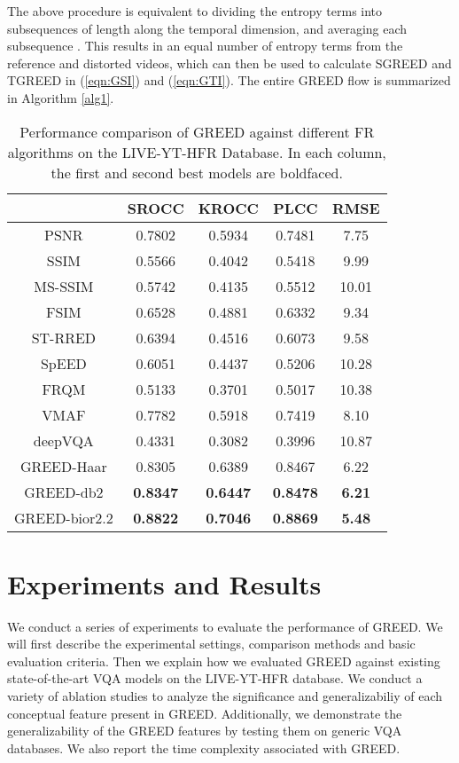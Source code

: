 \documentclass[journal]{IEEEtran}
\begin{document}
The above procedure is equivalent to dividing the entropy terms into subsequences of length  along the temporal dimension, and averaging each subsequence \cite{mackin2018study}. This results in an equal number of entropy terms from the reference and distorted videos, which can then be used to calculate SGREED and TGREED in (\ref{eqn:GSI}) and (\ref{eqn:GTI}). The entire GREED flow is summarized in Algorithm \ref{alg1}.

\begin{table}[t]
\caption{Performance comparison of GREED against different FR algorithms on the LIVE-YT-HFR Database. In each column, the first and second best models are boldfaced.}
    \label{Table:MOS_comparison}
    \centering
    \begin{tabular}{|c||c|c|c|c|}
        \hline
        ~    & SROCC  & KROCC  & PLCC  & RMSE  \\ \hline \hline
        PSNR & 0.7802 & 0.5934 & 0.7481 & 7.75 \\ 
        SSIM \cite{wang2004image} & 0.5566 & 0.4042 & 0.5418 & 9.99 \\ 
        MS-SSIM \cite{wang2003multiscale} & 0.5742 & 0.4135 & 0.5512 & 10.01 \\ 
        FSIM \cite{zhang2011fsim} & 0.6528 & 0.4881 & 0.6332 & 9.34 \\ 
        ST-RRED \cite{soundararajan2012video} & 0.6394 & 0.4516 & 0.6073 & 9.58 \\ 
        SpEED \cite{bampis2017speed} & 0.6051 & 0.4437 & 0.5206 & 10.28 \\ 
        FRQM \cite{zhang2017frame} & 0.5133 & 0.3701 & 0.5017 & 10.38 \\ 
        VMAF \cite{VMAF2016}& 0.7782 & 0.5918 & 0.7419 & 8.10 \\
        deepVQA \cite{kim2018deep} & 0.4331 & 0.3082 & 0.3996 & 10.87 \\ \hline
        GREED-Haar & 0.8305 & 0.6389 & 0.8467 & 6.22 \\
        GREED-db2 & \textbf{0.8347} & \textbf{0.6447} & \textbf{0.8478} & \textbf{6.21} \\
        GREED-bior2.2 & \textbf{0.8822} & \textbf{0.7046} & \textbf{0.8869} & \textbf{5.48} \\
        \hline
    \end{tabular}
\end{table}

\section{Experiments and Results}
\label{sec:experiments}
We conduct a series of experiments to evaluate the performance of GREED. We will first describe the experimental settings, comparison methods and basic evaluation criteria. Then we explain how we evaluated GREED against existing state-of-the-art VQA models on the LIVE-YT-HFR database. We conduct a variety of ablation studies to analyze the significance and generalizabiliy of each conceptual feature present in GREED. Additionally, we demonstrate the generalizability of the GREED features by testing them on generic VQA databases. We also report the time complexity associated with GREED.
\end{document}

